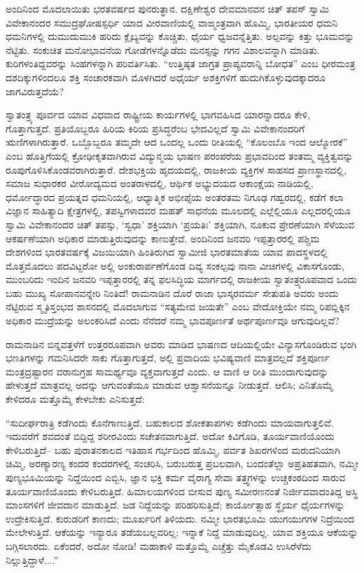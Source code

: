 ಅಂದಿನಿಂದ ಮೊದಲಾಯಿತು ಭರತವರ್ಷದ ಪುನರುತ್ಥಾನ. ದಕ್ಷಿಣೇಶ್ವರ ದೇವಮಾನವನ ಚಿತ್​ ತಪಸ್​ ಸ್ವಾಮಿ ವಿವೇಕಾನಂದರ ಸಮುದ್ರಘೋಷಸ್ಪರ್ಧಿ ಯಾದ ವೀರವಾಣಿಯಲ್ಲಿ ವಾಙ್ಮಂತ್ರವಾಗಿ ಹೊಮ್ಮಿ, ಭಾರತೀಯರ ಧಮನಿ ಧಮನಿಗಳಲ್ಲಿ ದುಮುದುಮುಕಿ ಹರಿದು ಕ್ಲೈಬ್ಯವನ್ನು ಕೊಚ್ಚಿತು, ಧೈರ್ಯ ಧ್ವಜವನ್ನೆತ್ತಿತು. ಅಲ್ಪವನ್ನು ಕಿತ್ತು ಭೂಮವನ್ನು ನೆಟ್ಟಿತು. ಸಂಕುಚಿತ ಮನೋಭಾವನೆಯ ಗೋಡೆಗಳನ್ನೊಡೆದು ಮನಸ್ಸನ್ನು ಗಗನ ವಿಶಾಲವನ್ನಾಗಿ ಮಾಡಿತು. ಕುರಿಗಳಂತಿದ್ದವರನ್ನು ಸಿಂಹಗಳನ್ನಾಗಿ ಪರಿವರ್ತಿಸಿತು. “ಉತ್ತಿಷ್ಠತ ಜಾಗ್ರತ ಪ್ರಾಪ್ಯವರಾನ್ನಿ ಬೋಧತ” ಎಂಬ ಧೀರಮಂತ್ರ ದಶದಿಕ್ಕುಗಳಿಂದಲೂ ಶಕ್ತಿ ಸಂಚಾರಕವಾಗಿ ಮೊಳಗಿದರೆ ಅಧೈರ್ಯ ಅಶಕ್ತಿಗಳಿಗೆ ಹುದುಗಿಕೊಳ್ಳುವುದಕ್ಕಾದರೂ ಜಾಗವಿರುತ್ತದೆಯೆ?

ಸ್ವಾತಂತ್ರ್ಯ ಪೂರ್ವದ ಯಾವ ವಿಧವಾದ ರಾಷ್ಟ್ರೀಯ ಕಾರ್ಯಗಳಲ್ಲಿ ಭಾಗವಹಿಸಿದ ಯಾರನ್ನಾದರೂ ಕೇಳಿ, ಗೊತ್ತಾಗುತ್ತದೆ. ಪ್ರತಿಯೊಬ್ಬರೂ ಹಿರಿಯ ಕಿರಿಯ ಪ್ರಸಿದ್ಧರೆಂಬ ಭೇದವಿಲ್ಲದೆ ಸ್ವಾಮಿ ವಿವೇಕಾನಂದರಿಗೆ ಋಣಿಗಳಾಗಿರುತ್ತಾರೆ. ಒಬ್ಬೊಬ್ಬರೂ ತಮ್ಮದೇ ಆದ ಒಂದಲ್ಲ ಒಂದು ರೀತಿಯಲ್ಲಿ “ಕೊಲಂಬೊ ಇಂದ ಆಲ್ಮೋರಕೆ” ಎಂಬ ಹೊತ್ತಿಗೆಯಲ್ಲಿ ಕ್ರೋಢೀಕೃತವಾಗಿರುವ ವಿದ್ಯುನ್ಮಯ ಭಾಷಣ ಪರಂಪರೆಯ ಪ್ರಭಾವದಿಂದ ತಂತಮ್ಮ ವ್ಯಕ್ತಿತ್ವವನ್ನು ರೂಪುಗೊಳಿಸಿಕೊಂಡವರಾಗಿರುತ್ತಾರೆ. ದೇಶಭಕ್ತಿಯ ಹೃದಯದಲ್ಲಿ, ರಾಜಕೀಯ ವ್ಯಕ್ತಿಗಳ ಸಾಹಸದ ಪ್ರಾಣಸ್ಥಾನದಲ್ಲಿ, ಸಮಾಜ ಸುಧಾರಕರ ವೀರೋದ್ಯಮದ ಅಂತರಾಳದಲ್ಲಿ, ಆರ್ಥಿಕ ಅಭ್ಯುದಯದ ಆಕಾಂಕ್ಷೆಯ ನಾಡಿಯಲ್ಲಿ, ಧರ್ಮೋದ್ಧಾರದ ಪ್ರಯತ್ನದ ಧಮನಿಯಲ್ಲಿ, ಆಧ್ಯಾತ್ಮಿಕ ಅಭೀಪ್ಸೆಯ ಅಂತರತಮ ನಿಗೂಢ ಗಹ್ವರದಲ್ಲಿ, ಕಡೆಗೆ ಕಲಾ ವಿಜ್ಞಾನ ಸಾಹಿತ್ಯಾದಿ ಕ್ಷೇತ್ರಗಳಲ್ಲಿ, ತಪಸ್ವಿಗಳಾದವರ ಮಹತ್​ ಸಾಧನೆಯ ಮೂಲದಲ್ಲಿ ಎಲ್ಲೆಲ್ಲಿಯೂ ಎಲ್ಲದರಲ್ಲಿಯೂ ಸ್ವಾಮಿ ವಿವೇಕಾನಂದರ ಚಿತ್​ ತಪಸ್ಸು, ‘ಸ್ವಧಾ’ ಶಕ್ತಿಯಾಗಿ ‘ಪ್ರಯತಿಃ’ ಶಕ್ತಿಯಾಗಿ, ನೂಕುವ ಪ್ರೇರಣೆಯಾಗಿ ಸೆಳೆಯುವ ಆಕರ್ಷಣೆಯಾಗಿ ಅಧಿಕಾರ ಮಾಡುತ್ತಿರುವುದನ್ನು ಕಾಣುತ್ತೇವೆ. ಅಂದಿನಿಂದ ಜನವರಿ ಇಪ್ಪತ್ತಾರರಲ್ಲಿ ಪಶ್ಚಿಮ ದೇಶಗಳಿಂದ ಭಾರತವರ್ಷಕ್ಕೆ ವಿಜಯಿಯಾಗಿ ಹಿಂತಿರುಗಿದ ಸ್ವಾಮೀಜಿ ಭಾರತಮಾತೆಯ ಯಾವ ಪಾದಸ್ಥಳದಲ್ಲಿ ಮೊತ್ತಮೊದಲು ಪದವಿಟ್ಟರೋ ಅಲ್ಲಿ ಅಂಕುರಾರ್ಪಣೆಗೊಂಡ ದಿವ್ಯ ಸಂಕಲ್ಪವು ನಾನಾ ವೀಚಿಗಳಲ್ಲಿ ವಿಕಾಸಗೊಂಡು, ಮುಂಬರಿದು ಇಂದಿನ ಜನವರಿ ಇಪ್ಪತ್ತಾರರಲ್ಲಿ ತನ್ನ ಫಲಸಿದ್ಧಿಯ ಮಾರ್ಗದಲ್ಲಿ ರಾಜಕೀಯ ಸ್ವಾತಂತ್ರ್ಯರೂಪವಾದ ಒಂದು ಬಹು ಮುಖ್ಯ ಸೋಪಾನವನ್ನೇರಿ ನಿಂತಿದೆ! ರಾಮನಾಡಿನ ದೊರೆ ರಾಜಾ ಭಾಸ್ಕರವರ್ಮ ಸೇತುಪತಿ ಅವರು ಅಂದು ನೆಟ್ಟಿರುವ ಸ್ಮೃತಿಸ್ತಂಭದ ಶಾಸನದಲ್ಲಿ ಮೊದಲಾಗುವ “ಸತ್ಯಮೇವ ಜಯತೇ” ಎಂಬ ವೇದೋಕ್ತಿಯೇ ನಮ್ಮ ರಿಪಬ್ಲಿಕ್ಕಿನ ಅಧಿಕಾರ ಮುದ್ರೆಯನ್ನು ಅಲಂಕರಿಸಿದೆ ಎಂದು ನೆನೆದರೆ ನಮ್ಮ ಭಾವಪೂರ್ಣತೆ ಅರ್ಥಪೂರ್ಣವೂ ಆಗುವುದಿಲ್ಲವೆ?

ರಾಮನಾಡಿನ ಬಿನ್ನವತ್ತಳೆಗೆ ಉತ್ತರರೂಪವಾಗಿ ಅವರು ಮಾಡಿದ ಭಾಷಣದ ಆದಿಯಲ್ಲಿಯೇ ವಿನ್ಯಾಸಗೊಂಡಿರುವ ಭಂಗಿ ಭಣತಿಗಳನ್ನು ಗಮನಿಸಿದರೇ ಸಾಕು ಗೊತ್ತಾಗುತ್ತದೆ, ಅಲ್ಲಿ ಪ್ರವಾದಿಯ ಭವಿಷ್ಯವಾಣಿ ಮಾತ್ರವಲ್ಲದೆ ಶಕ್ತಿಪೂರ್ಣ ಮಂತ್ರದ್ರಷ್ಟಾರನ ವರಾನುಗ್ರಹ ಸಾಮರ್ಥ್ಯವೂ ವ್ಯಕ್ತವಾಗುತ್ತದೆ ಎಂದು. ಆ ವಾಣಿ ಆ ರೀತಿ ಮುಂದಾಗುವುದನ್ನು ಹೇಳುತ್ತದೆ ಮಾತ್ರವಲ್ಲ ಅದನ್ನು ಆಗುವಂತೆಯೂ ಮಾಡುವ ಆಶ್ವಾಸನೆಯನ್ನೂ ನೀಡುತ್ತದೆ. ಆಲಿಸಿ; ಎನಿತೊಮ್ಮೆ ಕೇಳಿದರೂ ಮತ್ತೊಮ್ಮೆ ಕೇಳಬೇಕು ಎನಿಸುತ್ತದೆ:

“ಸುದೀರ್ಘರಾತ್ರಿ ಕಡೆಗಿಂದು ಕೊನೆಗಾಣುತ್ತಿದೆ. ಬಹುಕಾಲದ ಶೋಕತಾಪಗಳು ಕಡೆಗಿಂದು ಮಾಯವಾಗುತ್ತಲಿವೆ. ಇದುವರೆಗೆ ಶವದಂತೆ ಬಿದ್ದಿದ್ದ ಶರೀರವಿಂದು ಸಚೇತನವಾಗುತ್ತಿದೆ. ಅದೋ ಕಿವಿಗೊಡಿ, ತೂರ್ಯವಾಣಿಯೊಂದು ಕೇಳಿಬರುತ್ತಿದೆ– ಬಹು ಪುರಾತನಕಾಲದ ಇತಿಹಾಸ ಗರ್ಭದಿಂದ ಹೊಮ್ಮಿ, ಪರ್ವತ ಶಿಖರಗಳಿಂದ ಮರುದನಿಯಾಗಿ ಚಿಮ್ಮಿ, ಅರಣ್ಯಾರಣ್ಯ ಕಂದರ ಕಂದರಗಳಲ್ಲಿ ಸಂಚರಿಸಿ, ಬರುಬರುತ್ತ ಪ್ರಬಲವಾಗಿ, ಬಂದಂತೆಲ್ಲಾ ಅಪ್ರತಿಹತವಾಗಿ, ನಮ್ಮೀ ಪುಣ್ಯಭೂಮಿಯನ್ನು ನಿದ್ದೆಯಿಂದ ಎಬ್ಬಿಸಿ, ಜ್ಞಾನ ಭಕ್ತಿ ಕರ್ಮ ವೈರಾಗ್ಯ ಸೇವಾ ತತ್ತ್ವಗಳನ್ನು ಉಚ್ಚಕಂಠದಿಂದ ಸಾರುವ ತೂರ್ಯವಾಣಿಯೊಂದು ಕೇಳಿಬರುತ್ತಿದೆ. ಹಿಮಾಲಯಗಳಿಂದ ಬೀಸುವ ಪುಣ್ಯ ಸಮೀರಣನಂತೆ ನಿರ್ಜೀವವಾದಂತಿದ್ದ ಅಸ್ಥಿ ಮಾಂಸಗಳಿಗೆ ಜೀವದಾನ ಮಾಡುತ್ತಿದೆ. ಜಡ ನಿದ್ದೆಯನ್ನು ಪರಿಹರಿಸುತ್ತಿದೆ; ಕಾರ್ಯೋತ್ಸಾಹ ಸ್ಥೈರ್ಯ ಧೈರ್ಯಗಳನ್ನು ಉದ್ರೇಕಿಸುತ್ತಿದೆ. ಕುರುಡರಿಗೆ ಕಾಣದು; ಮೂರ್ಖರಿಗೆ ತಿಳಿಯದು. ನಮ್ಮೀ ಭಾರತಭೂಮಿ ಯುಗಯುಗಗಳ ನಿದ್ರೆಯಿಂದ ಮೇಲೇಳುತ್ತಿದೆ. ಆಕೆಯನ್ನು ಇನ್ಯಾರೂ ತಡೆಯಬಲ್ಲವರಿಲ್ಲ; ಇನ್ನಾಕೆ ನಿದ್ದೆ ಮಾಡುವುದಿಲ್ಲ. ಯಾವ ಶಕ್ತಿಯೂ ಆಕೆಯನ್ನು ಬಗ್ಗಿಸಲಾರದು. ಏಕೆಂದರೆ, ಅದೋ ನೋಡಿ! ಮಹಾಕಾಳಿ ಮತ್ತೊಮ್ಮೆ ಎಚ್ಚೆತ್ತು ಮೈಕೊಡವಿ ಉಸಿರೆಳೆದು ನಿಲ್ಲುತ್ತಿದ್ದಾಳೆ....”

